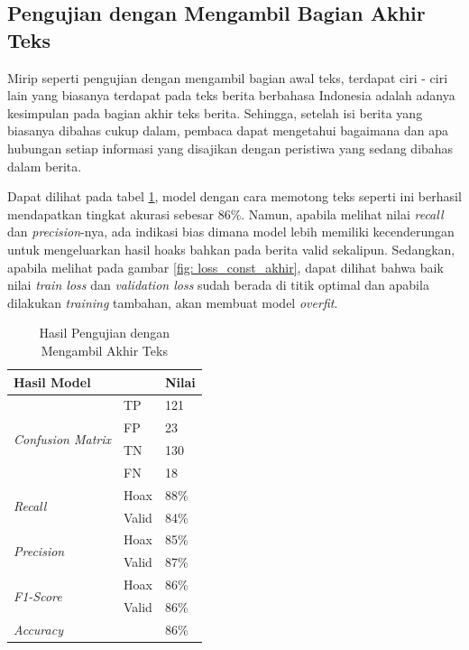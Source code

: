 \subsection{Pengujian dengan Mengambil Bagian Akhir Teks}

Mirip seperti pengujian dengan mengambil bagian awal teks, terdapat ciri - ciri lain yang biasanya terdapat pada teks berita berbahasa Indonesia adalah adanya kesimpulan pada bagian akhir teks berita. Sehingga, setelah isi berita yang biasanya dibahas cukup dalam, pembaca dapat mengetahui bagaimana dan apa hubungan setiap informasi yang disajikan dengan peristiwa yang sedang dibahas dalam berita.

Dapat dilihat pada tabel \ref{tab: const_akhir}, model dengan cara memotong teks seperti ini berhasil mendapatkan tingkat akurasi sebesar 86\%. Namun, apabila melihat nilai \textit{recall} dan \textit{precision}-nya, ada indikasi bias dimana model lebih memiliki kecenderungan untuk mengeluarkan hasil hoaks bahkan pada berita valid sekalipun. Sedangkan, apabila melihat pada gambar \ref{fig: loss_const_akhir}, dapat dilihat bahwa baik nilai \textit{train loss} dan \textit{validation loss} sudah berada di titik optimal dan apabila dilakukan \textit{training} tambahan, akan membuat model \textit{overfit}.

\begin{table}
    \caption{Hasil Pengujian dengan Mengambil Akhir Teks}
    \label{tab: const_akhir}
    \centering
    \begin{tabular}{|l|l|l|}
        \hline
        \multicolumn{2}{|l|}{\textbf{Hasil Model}} & \textbf{Nilai}        \\ \hline
        \multirow{4}{*}{\textit{Confusion Matrix}} & TP             & 121  \\ \cline{2-3}
                                                   & FP             & 23   \\ \cline{2-3}
                                                   & TN             & 130  \\ \cline{2-3}
                                                   & FN             & 18   \\ \hline
        \multirow{2}{*}{\textit{Recall}}           & Hoax           & 88\% \\ \cline{2-3}
                                                   & Valid          & 84\% \\ \hline
        \multirow{2}{*}{\textit{Precision}}        & Hoax           & 85\% \\ \cline{2-3}
                                                   & Valid          & 87\% \\ \hline
        \multirow{2}{*}{\textit{F1-Score}}         & Hoax           & 86\% \\ \cline{2-3}
                                                   & Valid          & 86\% \\ \hline
        \multicolumn{2}{|l|}{\textit{Accuracy}}    & 86\%                  \\ \hline
    \end{tabular}
\end{table}

